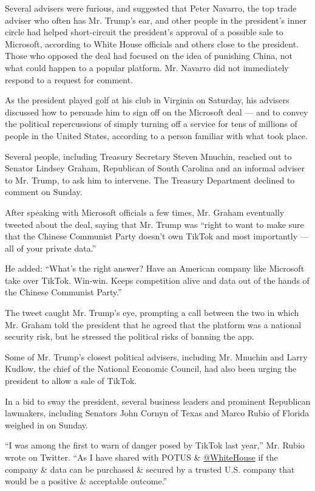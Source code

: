 Several advisers were furious, and suggested that Peter Navarro, the top
trade adviser who often has Mr. Trump's ear, and other people in the
president's inner circle had helped short-circuit the president's
approval of a possible sale to Microsoft, according to White House
officials and others close to the president. Those who opposed the deal
had focused on the idea of punishing China, not what could happen to a
popular platform. Mr. Navarro did not immediately respond to a request
for comment.

As the president played golf at his club in Virginia on Saturday, his
advisers discussed how to persuade him to sign off on the Microsoft deal
--- and to convey the political repercussions of simply turning off a
service for tens of millions of people in the United States, according
to a person familiar with what took place.

Several people, including Treasury Secretary Steven Mnuchin, reached out
to Senator Lindsey Graham, Republican of South Carolina and an informal
adviser to Mr. Trump, to ask him to intervene. The Treasury Department
declined to comment on Sunday.

After speaking with Microsoft officials a few times, Mr. Graham
eventually tweeted about the deal, saying that Mr. Trump was ``right to
want to make sure that the Chinese Communist Party doesn't own TikTok
and most importantly --- all of your private data.''

He added: ``What's the right answer? Have an American company like
Microsoft take over TikTok. Win-win. Keeps competition alive and data
out of the hands of the Chinese Communist Party.''

The tweet caught Mr. Trump's eye, prompting a call between the two in
which Mr. Graham told the president that he agreed that the platform was
a national security risk, but he stressed the political risks of banning
the app.

Some of Mr. Trump's closest political advisers, including Mr. Mnuchin
and Larry Kudlow, the chief of the National Economic Council, had also
been urging the president to allow a sale of TikTok.

In a bid to sway the president, several business leaders and prominent
Republican lawmakers, including Senators John Cornyn of Texas and Marco
Rubio of Florida weighed in on Sunday.

``I was among the first to warn of danger posed by TikTok last year,''
Mr. Rubio wrote on Twitter. ``As I have shared with POTUS \&
\href{https://twitter.com/WhiteHouse}{@WhiteHouse} if the company \&
data can be purchased \& secured by a trusted U.S. company that would be
a positive \& acceptable outcome.''

